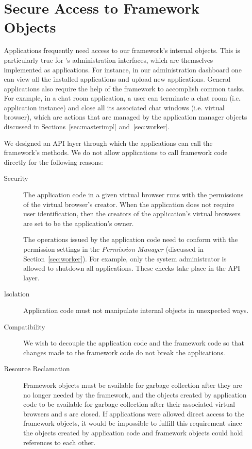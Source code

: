 \section{Secure Access to Framework Objects}
\label{sec:api}

Applications frequently need access to our framework's internal objects. 
This is particularly true for \cb's administration interfaces, which are 
themselves implemented as \cb applications.
For instance, in our administration dashboard one can view all the installed
applications and upload new applications. General applications also
require the help of the framework to accomplish common tasks.
For example, in
a chat room application, a user can terminate a chat room (i.e. application
instance) and close all its associated chat windows (i.e. virtual browser),
which are actions that are managed by the application manager objects discussed
in Sections~\ref{sec:masterimpl} and~\ref{sec:worker}.

We designed an API layer through which the applications can call the
framework's methods.  We do not allow applications to call framework
code directly for the following reasons:

\begin{description}

\item[Security] 
The application code in a given virtual browser runs with
the permissions of the virtual browser's creator.
When the application does not require user identification, then 
the creators of the application's virtual browsers are 
set to be the application's owner.

The operations issued by the application code need to conform with the 
permission settings in the \emph{Permission Manager} (discussed in
Section~\ref{sec:worker}).
For example, only the system administrator is
allowed to shutdown all applications. 
These checks take place in the API layer.


\item[Isolation]  Application code must not 
manipulate internal objects in unexpected ways. 

\item[Compatibility]  
We wish to
decouple the application code and the framework code so  that changes made to
the framework code do not break the applications.   

\item[Resource Reclamation]  
Framework objects must be available for garbage collection after they are no
longer needed by the framework,  and the objects created by application code
to be available for garbage collection after their associated virtual browsers
and \appins{}s are closed.  If applications were allowed direct access to the
framework objects,   it would be impossible to fulfill this requirement
since the objects created by application code and framework objects could hold
references to each other.

\end{description}



